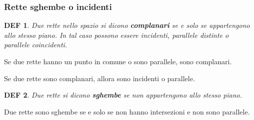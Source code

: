 \documentclass{article}     %
\newtheorem*{definition}{DEF}
\begin{document}
            \subsubsection{Rette sghembe o incidenti}
                \begin{definition}
                    Due rette nello spazio si dicono \textbf{complanari} se e solo se appartengono allo stesso piano. In tal caso possono essere incidenti, parallele distinte o parallele coincidenti. 
                \end{definition}
                Se due rette hanno un punto in comune o sono parallele, sono complanari. 

                Se due rette sono complanari, allora sono incidenti o parallele.

                \begin{definition}
                    Due rette si dicono \textbf{sghembe} se non appartengono allo stesso piano. 
                \end{definition}
                Due rette sono sghembe se e solo se non hanno intersezioni e non sono parallele.
\end{document}
